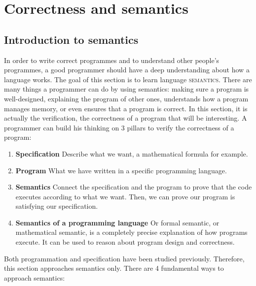 \documentclass[11pt,a4paper,twoside,openright]{report}
\begin{document}
\section{Correctness and semantics}

\subsection{Introduction to semantics}

In order to write correct programmes and to understand other people's programmes, a 
good programmer should have a deep understanding about how a language 
works. 
The goal of this section is to learn language \textsc{semantics}. There are 
many 
things a programmer can do by using semantics: making sure a program is 
well-designed, explaining the program of other ones, understands how a program 
manages memory, or even ensures that a program is correct. In this section, 
it is 
actually the verification, the correctness of a program that will be 
interesting. A programmer can build his thinking on 3 pillars to verify the 
correctness of a program:

\begin{enumerate}
	\item \textbf{Specification} Describe what we want, a mathematical 
formula for example.
	\item \textbf{Program} What we have written in a specific programming 
language.
	\item \textbf{Semantics} Connect the specification and the program to 
prove that the code executes according to what we want. Then, we can prove our 
program is satisfying our specification.
	\item[] \textbf{Semantics of a programming language} Or formal 
semantic, or mathematical semantic, is a completely precise explanation of how 
programs execute. It can be used to reason about program design and 
correctness.
\end{enumerate}

Both programmation and specification have been studied previously. Therefore, 
this section approaches semantics only. There are 4 fundamental ways to 
approach 
semantics: 
\end{document}
